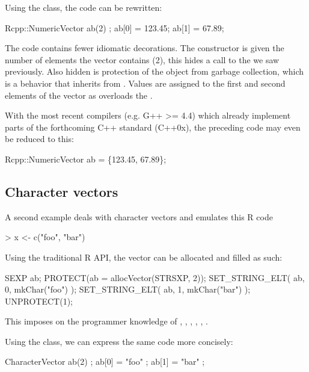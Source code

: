 Using the  class, the code can be rewritten: 

\begin{example}
Rcpp::NumericVector ab(2) ;
ab[0] = 123.45;
ab[1] = 67.89;
\end{example}

The code contains fewer idiomatic decorations. The 
constructor is given the number of elements the vector contains (2), this
hides a call to the  we saw previously. Also hidden is
protection of the object from garbage collection, which is a behavior that
 inherits from .  Values are assigned to
the first and second elements of the vector as  overloads
the .

With the most recent compilers (e.g. G++ >= 4.4) which already implement
parts of the forthcoming C++ standard (C++0x), the preceding code may even be
reduced to this:

\begin{example}
Rcpp::NumericVector ab = \{123.45, 67.89\};
\end{example}

\subsection{Character vectors}

A second example deals with character vectors and emulates this R code

\begin{example}
> x <- c("foo", "bar")
\end{example}

Using the traditional R API, the vector can be allocated and filled as such:

\begin{example}
SEXP ab;
PROTECT(ab = allocVector(STRSXP, 2));
SET_STRING_ELT( ab, 0, mkChar("foo") );
SET_STRING_ELT( ab, 1, mkChar("bar") );
UNPROTECT(1);
\end{example}

This imposes on the programmer knowledge of , , 
, , , . 

Using the  class, we can express the same
code more concisely:

\begin{example}
CharacterVector ab(2) ;
ab[0] = "foo" ;
ab[1] = "bar" ;
\end{example}


